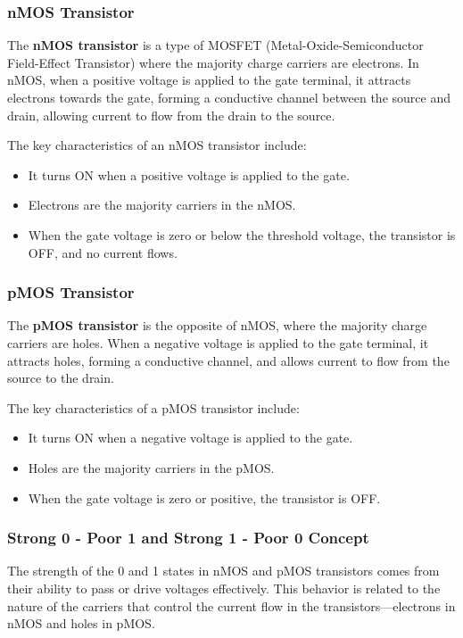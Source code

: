 \documentclass[a4paper,12pt]{article}
\begin{document}
	\subsubsection{nMOS Transistor}
	
	The \textbf{nMOS transistor} is a type of MOSFET (Metal-Oxide-Semiconductor Field-Effect Transistor) where the majority charge carriers are electrons. In nMOS, when a positive voltage is applied to the gate terminal, it attracts electrons towards the gate, forming a conductive channel between the source and drain, allowing current to flow from the drain to the source.
	
	The key characteristics of an nMOS transistor include:
	\begin{itemize}
		\item It turns ON when a positive voltage is applied to the gate.
		\item Electrons are the majority carriers in the nMOS.
		\item When the gate voltage is zero or below the threshold voltage, the transistor is OFF, and no current flows.
	\end{itemize}
	
	\subsubsection{pMOS Transistor}
	
	The \textbf{pMOS transistor} is the opposite of nMOS, where the majority charge carriers are holes. When a negative voltage is applied to the gate terminal, it attracts holes, forming a conductive channel, and allows current to flow from the source to the drain.
	
	The key characteristics of a pMOS transistor include:
	\begin{itemize}
		\item It turns ON when a negative voltage is applied to the gate.
		\item Holes are the majority carriers in the pMOS.
		\item When the gate voltage is zero or positive, the transistor is OFF.
	\end{itemize}
	
	\subsubsection{ Strong 0 - Poor 1 and Strong 1 - Poor 0 Concept}
	
	The strength of the 0 and 1 states in nMOS and pMOS transistors comes from their ability to pass or drive voltages effectively. This behavior is related to the nature of the carriers that control the current flow in the transistors—electrons in nMOS and holes in pMOS.
	
\end{document}
